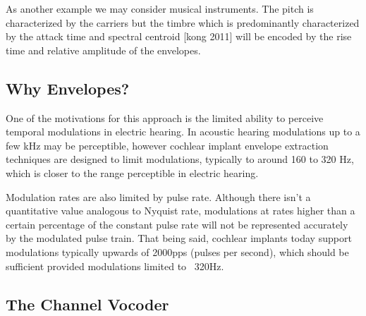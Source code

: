 \documentclass [11pt, proquest,oneside] {uwthesis}[2015/03/03]
\begin{document}
As another example we may consider musical instruments.  The pitch is characterized by the carriers but the timbre which is predominantly characterized by the attack time and spectral centroid [kong 2011] will be encoded by the rise time and relative amplitude of the envelopes.



\subsection{Why Envelopes?}

One of the motivations for this approach is the limited ability to perceive temporal modulations in electric hearing.  In acoustic hearing modulations up to a few kHz may be perceptible, however cochlear implant envelope extraction techniques are designed to limit modulations, typically to around 160 to 320 Hz, which is closer to the range perceptible in electric hearing.

Modulation rates are also limited by pulse rate.  Although there isn't a quantitative value analogous to Nyquist rate, modulations at rates higher than a certain percentage of the constant pulse rate will not be represented accurately by the modulated pulse train.  That being said, cochlear implants today support modulations typically upwards of 2000pps (pulses per second), which should be sufficient provided modulations limited to ~320Hz.

\subsection{The Channel Vocoder}
\end{document}
